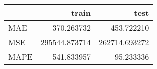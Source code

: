 \begin{tabular}{lrr}
\toprule
{} &          train &           test \\
\midrule
MAE  &     370.263732 &     453.722210 \\
MSE  &  295544.873714 &  262714.693272 \\
MAPE &     541.833957 &      95.233336 \\
\bottomrule
\end{tabular}
